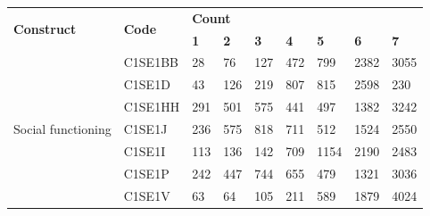 \documentclass[11pt]{article}
\begin{document}
\begin{table}[h!]
\begin{tabular}{|l|l|lllllll|}
\hline
\multirow{2}{*}{\textbf{Construct}} & \multirow{2}{*}{\textbf{Code}} & \multicolumn{7}{l|}{\textbf{Count}}                                                                                                                                                                                    \\ \cline{3-9} 
                                    &                                & \multicolumn{1}{l|}{\textbf{1}} & \multicolumn{1}{l|}{\textbf{2}} & \multicolumn{1}{l|}{\textbf{3}} & \multicolumn{1}{l|}{\textbf{4}} & \multicolumn{1}{l|}{\textbf{5}} & \multicolumn{1}{l|}{\textbf{6}} & \textbf{7} \\ \hline
\multirow{7}{*}{Social functioning} & C1SE1BB                        & \multicolumn{1}{l|}{28}         & \multicolumn{1}{l|}{76}         & \multicolumn{1}{l|}{127}        & \multicolumn{1}{l|}{472}        & \multicolumn{1}{l|}{799}        & \multicolumn{1}{l|}{2382}       & 3055       \\ \cline{2-9} 
                                    & C1SE1D                         & \multicolumn{1}{l|}{43}         & \multicolumn{1}{l|}{126}        & \multicolumn{1}{l|}{219}        & \multicolumn{1}{l|}{807}        & \multicolumn{1}{l|}{815}        & \multicolumn{1}{l|}{2598}       & 230        \\ \cline{2-9} 
                                    & C1SE1HH                        & \multicolumn{1}{l|}{291}        & \multicolumn{1}{l|}{501}        & \multicolumn{1}{l|}{575}        & \multicolumn{1}{l|}{441}        & \multicolumn{1}{l|}{497}        & \multicolumn{1}{l|}{1382}       & 3242       \\ \cline{2-9} 
                                    & C1SE1J                         & \multicolumn{1}{l|}{236}        & \multicolumn{1}{l|}{575}        & \multicolumn{1}{l|}{818}        & \multicolumn{1}{l|}{711}        & \multicolumn{1}{l|}{512}        & \multicolumn{1}{l|}{1524}       & 2550       \\ \cline{2-9} 
                                    & C1SE1I                         & \multicolumn{1}{l|}{113}        & \multicolumn{1}{l|}{136}        & \multicolumn{1}{l|}{142}        & \multicolumn{1}{l|}{709}        & \multicolumn{1}{l|}{1154}       & \multicolumn{1}{l|}{2190}       & 2483       \\ \cline{2-9} 
                                    & C1SE1P                         & \multicolumn{1}{l|}{242}        & \multicolumn{1}{l|}{447}        & \multicolumn{1}{l|}{744}        & \multicolumn{1}{l|}{655}        & \multicolumn{1}{l|}{479}        & \multicolumn{1}{l|}{1321}       & 3036       \\ \cline{2-9} 
                                    & C1SE1V                         & \multicolumn{1}{l|}{63}         & \multicolumn{1}{l|}{64}         & \multicolumn{1}{l|}{105}        & \multicolumn{1}{l|}{211}        & \multicolumn{1}{l|}{589}        & \multicolumn{1}{l|}{1879}       & 4024       \\ \hline
\end{tabular}
\end{table}
\end{document}
